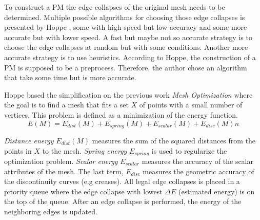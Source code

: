 To construct a PM the edge collapses of the original mesh needs to be determined. Multiple possible algorithms for choosing those edge collapses is presented by Hoppe \cite{hoppe1996progressive}, some with high speed but low accuracy and some more accurate but with lower speed. A fast but maybe not so accurate strategy is to choose the edge collapses at random but with some conditions. Another more accurate strategy is to use heuristics. According to Hoppe, the construction of a PM is supposed to be a preprocess. Therefore, the author chose an algorithm that take some time but is more accurate.

Hoppe based the simplification on the previous work \emph{Mesh Optimization} \cite{hoppe1993mesh} where the goal is to find a mesh that fits a set $X$ of points with a small number of vertices. This problem is defined as a minimization of the energy function.
\begin{equation}
  E(M) = E_{dist}(M) + E_{spring}(M) + E_{scalar}(M) + E_{disc}(M)n
\end{equation}

\emph{Distance energy} $E_{dist}(M)$ measures the sum of the squared distances from the points in $X$ to the mesh. \emph{Spring energy} $E_{spring}$ is used to regularize the optimization problem. \emph{Scalar energy} $E_{scalar}$ measures the accuracy of the scalar attributes of the mesh. The last term, $E_{disc}$ measures the geometric accuracy of the discontinuity curves (e.g creases). All legal edge collapses is placed in a priority queue where the edge collapse with lowest $\Delta E$ (estimated energy) is on the top of the queue. After an edge collapse is performed, the energy of the neighboring edges is updated.

